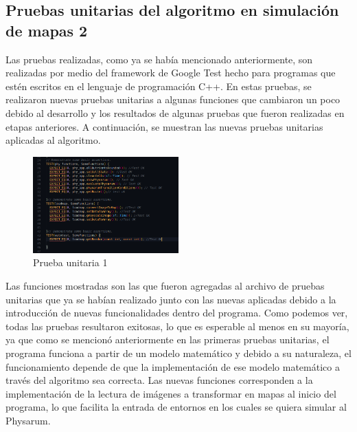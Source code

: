 \subsection{Pruebas unitarias del algoritmo en simulaci\'on de mapas 2}
    Las pruebas realizadas, como ya se hab\'ia mencionado
        anteriormente, son realizadas por medio del framework de
        Google Test hecho para programas que est\'en escritos en el
        lenguaje de programaci\'on C++.
        \vskip 0.5cm
    En estas pruebas, se realizaron nuevas pruebas unitarias a
        algunas funciones que cambiaron un poco debido al
        desarrollo y los resultados de algunas pruebas que fueron
        realizadas en etapas anteriores. A continuaci\'on, se muestran
        las nuevas pruebas unitarias aplicadas al algoritmo.
        \vskip 0.5cm
    \begin{figure}[htbp]
        \centering
        \includegraphics[width=0.5\textwidth]{./images/Pruebas/simulador/image041.png}
        \caption{Prueba unitaria 1}
        \label{fig:Prueba unitaria 1}
    \end{figure}
    Las funciones mostradas son las que fueron agregadas al
        archivo de pruebas unitarias que ya se hab\'ian realizado junto
        con las nuevas aplicadas debido a la introducci\'on de nuevas
        funcionalidades dentro del programa. Como podemos ver,
        todas las pruebas resultaron exitosas, lo que es esperable al
        menos en su mayor\'ia, ya que como se mencion\'o anteriormente en las primeras pruebas unitarias, el programa
        funciona a partir de un modelo matem\'atico y debido a su
        naturaleza, el funcionamiento depende de que la
        implementaci\'on de ese modelo matem\'atico a trav\'es del
        algoritmo sea correcta.
        \vskip 0.5cm
    Las nuevas funciones corresponden a la implementaci\'on de
        la lectura de im\'agenes a transformar en mapas al inicio del
        programa, lo que facilita la entrada de entornos en los cuales
        se quiera simular al Physarum.
        \vskip 0.5cm